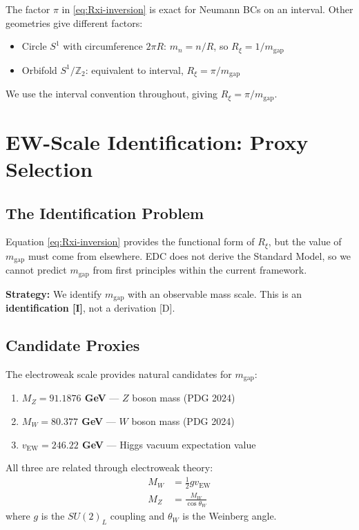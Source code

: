 \documentclass[11pt,a4paper]{article}
\newcommand{\Rxi}{R_\xi}
\newcommand{\MZ}{M_Z}
\newcommand{\MW}{M_W}
\newcommand{\vEW}{v_{\mathrm{EW}}}
\newcommand{\mgap}{m_{\mathrm{gap}}}
\begin{document}
The factor $\pi$ in \eqref{eq:Rxi-inversion} is exact for Neumann BCs on an interval.
Other geometries give different factors:
\begin{itemize}
\item Circle $S^1$ with circumference $2\pi R$: $m_n = n/R$, so $\Rxi = 1/\mgap$
\item Orbifold $S^1/\mathbb{Z}_2$: equivalent to interval, $\Rxi = \pi/\mgap$
\end{itemize}

We use the interval convention throughout, giving $\Rxi = \pi/\mgap$.

\section{EW-Scale Identification: Proxy Selection}

\subsection{The Identification Problem}

Equation \eqref{eq:Rxi-inversion} provides the functional form of $\Rxi$, but
the value of $\mgap$ must come from elsewhere. EDC does not derive the Standard
Model, so we cannot predict $\mgap$ from first principles within the current
framework.

\textbf{Strategy:} We identify $\mgap$ with an observable mass scale. This is
an \textbf{identification [I]}, not a derivation [D].

\subsection{Candidate Proxies}

The electroweak scale provides natural candidates for $\mgap$:

\begin{enumerate}
\item \textbf{$\MZ = 91.1876$ GeV} — $Z$ boson mass (PDG 2024)
\item \textbf{$\MW = 80.377$ GeV} — $W$ boson mass (PDG 2024)
\item \textbf{$\vEW = 246.22$ GeV} — Higgs vacuum expectation value
\end{enumerate}

All three are related through electroweak theory:
\begin{align}
\MW &= \frac{1}{2} g \vEW \label{eq:MW-vEW}\\
\MZ &= \frac{\MW}{\cos\theta_W} \label{eq:MZ-MW}
\end{align}
where $g$ is the $SU(2)_L$ coupling and $\theta_W$ is the Weinberg angle.
\end{document}
